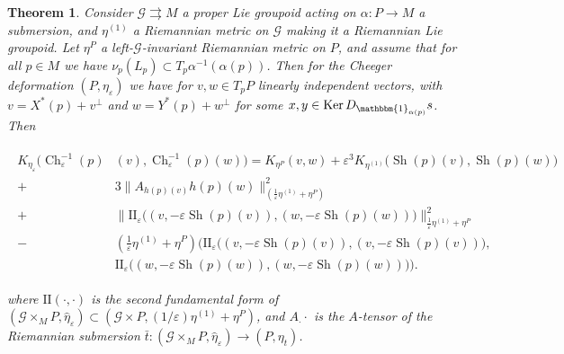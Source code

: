 \documentclass[12pt,a4paper,reqno]{amsart}
\DeclareMathOperator{\Ch}{Ch}
\DeclareMathOperator{\kernel}{Ker}
\DeclareMathOperator{\Sh}{Sh} %
\newcommand{\1}{\mathbbm{1}} %
\newcommand{\G}{\mathcal{G}} %
\newcommand{\II}{\mathrm{II}} %
\newtheorem{thm}{Theorem}[section]
\theoremstyle{definition}
\theoremstyle{TheoremNum}
\begin{document}
\begin{thm}\th\label{T: Proof of theorem B}
Consider $\G\rightrightarrows M$ a proper Lie groupoid acting on $\alpha\colon P\to M$ a submersion, and $\eta^{(1)}$ a Riemannian metric on $\G$ making it a Riemannian Lie groupoid. Let $\eta^P$ a left-$\G$-invariant Riemannian metric on $P$, and assume that for all $p\in M$ we have $\nu_p(L_p)\subset T_p \alpha^{-1}(\alpha(p))$. Then for the Cheeger deformation $(P,\eta_\varepsilon)$ we have for $v,w\in T_pP$ linearly independent vectors, with $v = X^\ast(p)+v^\perp$ and $w = Y^\ast(p)+w^\perp$ for some $x,y\in \kernel D_{\1_{\alpha(p)}} s$. Then
\begin{linenomath}
\begin{align}\label{EQ: Full curvature description}
\begin{split}
K_{\eta_\varepsilon}\Big(\Ch^{-1}_\varepsilon(p)&(v),\Ch^{-1}_\varepsilon(p)(w)\Big)  = K_{\eta^P}(v,w)+\varepsilon^3K_{\eta^{(1)}}\Big(\Sh(p)(v),\Sh(p)(w)\Big)\\
+&3\Big\|A_{h(p)(v)}h(p)(w)\Big\|^2_{\left(\frac{1}{\varepsilon}\eta^{(1)}+\eta^P\right)}\\
+&\Big\|\II_\varepsilon\big((v,-\varepsilon \Sh(p)(v)),(w,-\varepsilon\Sh(p)(w))\big)\Big\|^2_{\frac{1}{\varepsilon}\eta^{(1)}+\eta^P}\\
 -&\left(\frac{1}{\varepsilon}\eta^{(1)}+\eta^P\right)\Big(\II_\varepsilon\big((v,-\varepsilon\Sh(p)(v)),(v,-\varepsilon\Sh(p)(v))\big),\\
 &\II_\varepsilon\big((w,-\varepsilon\Sh(p)(w)),(w,-\varepsilon\Sh(p)(w))\big)\Big).
\end{split}
\end{align}
\end{linenomath}
where $\II(\cdot,\cdot)$ is the second fundamental form of $(\G\times_M P,\widehat{\eta}_\varepsilon)\subset (\G\times P,(1/\varepsilon)\eta^{(1)}+\eta^{P})$, and $A_\cdot \cdot$ is the $A$-tensor of the Riemannian submersion $\bar{t}\colon (\G\times_M P,\hat{\eta}_\varepsilon)\to (P,\eta_t)$.
\end{thm}
\end{document}
